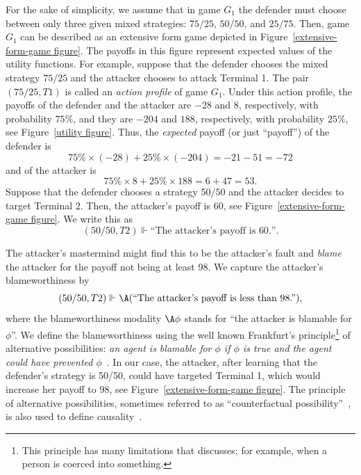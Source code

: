 \documentclass[letterpaper]{article}
\begin{document}
For the sake of simplicity, we assume that in game $G_1$ the defender must choose between only three given mixed strategies: $75/25$, $50/50$, and $25/75$. Then, game $G_1$ can be described as an extensive form game depicted in Figure~\ref{extensive-form-game figure}. The payoffs in this figure represent expected values of the utility functions. For example, suppose that the defender chooses the mixed strategy $75/25$ and the attacker chooses to attack Terminal 1. The pair $(75/25,T1)$ is called an {\em action profile} of game $G_1$. Under this action profile, the payoffs of the defender and the attacker are $-28$ and $8$, respectively, with probability $75\%$, and they are $-204$ and $188$, respectively, with probability $25\%$, see Figure~\ref{utility figure}. Thus, the {\em expected} payoff (or just ``payoff'') of the defender is
$$
75\%\times (-28)+25\%\times (-204)=-21 -51=-72
$$
and of the attacker is
$$
75\%\times 8+25\%\times 188=6+47=53.
$$
Suppose that the defender chooses a strategy $50/50$ and the attacker decides to target Terminal 2. Then, the attacker's payoff is $60$, see Figure~\ref{extensive-form-game figure}. We write this as
$$
(50/50,T2)\Vdash \mbox{``The attacker's payoff is $60$.''}.
$$


The attacker's mastermind might find this to be the attacker's fault and {\em blame} the attacker for the payoff not being at least 98. We capture the attacker's blameworthiness by
$$
(50/50,T2)\Vdash \A(\mbox{``The attacker's payoff is less than $98$.''}),
$$
where the blameworthiness modality $\A\phi$ stands for ``the attacker is blamable for $\phi$''. We define the blameworthiness using the well known Frankfurt's  principle\footnote{This principle has many limitations  that \cite{f69tjop} discusses; for example, when a person is coerced into something.} of alternative possibilities: {\em an agent is blamable for $\phi$ if $\phi$ is true and the agent could have prevented $\phi$}~\cite{f69tjop,w17}. In our case, the attacker, after learning that the  defender's strategy is 50/50, could have targeted Terminal 1, which would increase her payoff to $98$, see Figure~\ref{extensive-form-game figure}. The principle of alternative possibilities, sometimes referred to as ``counterfactual possibility''~\cite{c15cop}, is also used to define causality~\cite{lewis13,h16,bs18aaai}.
\end{document}
